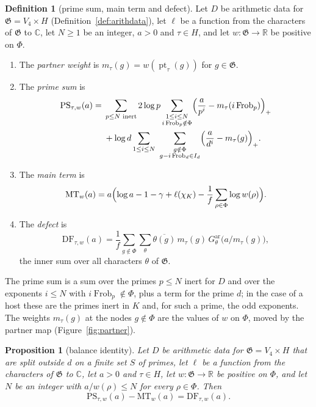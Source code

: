 \documentclass[11pt]{amsbook}
\theoremstyle{plain}
\newtheorem{proposition}[theorem]{Proposition}
\theoremstyle{definition}
\newtheorem{definition}[theorem]{Definition}
\theoremstyle{remark}
\numberwithin{equation}{section}
\numberwithin{figure}{chapter}
\numberwithin{table}{chapter}
\newcommand{\R}{\mathbb{R}}
\renewcommand{\C}{\mathbb{C}}
\newcommand{\Frob}{\operatorname{Frob}}
\newcommand{\GG}{\mathfrak{G}}
\newcommand{\pt}{\operatorname{pt}}
\newcommand{\GPsi}{G^{\mathrm{ar}}}
\newcommand{\PS}{\mathrm{PS}}
\newcommand{\MT}{\mathrm{MT}}
\newcommand{\DF}{\mathrm{DF}}
\begin{document}
\begin{definition}[prime sum, main term and defect]\label{def:ask}
Let $D$ be arithmetic data for $\GG=V_4\times H$
(Definition~\ref{def:arithdata}), let $\ell$ be a function from the
characters of $\GG$ to $\C$, let $N\ge1$ be an integer, $a>0$ and
$\tau\in H$, and let $w\colon\GG\to\R$ be positive on $\Phi$.
\begin{enumerate}[label=(\arabic*)]
\item\label{item:ask-partner}
The \emph{partner weight} is $m_\tau(g)=w(\pt_\tau(g))$ for
$g\in\GG$.
\item The \emph{prime sum} is
\[
\begin{aligned}
\PS_{\tau,w}(a)={}&\sum_{p\le N\text{ inert}}2\log p
\sum_{\substack{1\le i\le N\\ i\Frob_p\notin\Phi}}
\Bigl(\frac{a}{p^i}-m_\tau(i\Frob_p)\Bigr)_+\\
&+\log d\sum_{1\le i\le N}\ \sum_{\substack{g\notin\Phi\\
g-i\Frob_d\in I_d}}\Bigl(\frac{a}{d^i}-m_\tau(g)\Bigr)_+.
\end{aligned}
\]
\item The \emph{main term} is
\[
\MT_w(a)=a\Bigl(\log a-1-\gamma+\ell(\chi_K)-\frac1f
\sum_{\rho\in\Phi}\log w(\rho)\Bigr).
\]
\item The \emph{defect} is
\[
\DF_{\tau,w}(a)=\frac1f\sum_{g\notin\Phi}\sum_\theta
\overline{\theta(g)}\,m_\tau(g)\,\GPsi_\theta\bigl(a/m_\tau(g)\bigr),
\]
the inner sum over all characters $\theta$ of $\GG$.
\end{enumerate}
\end{definition}

\noindent The prime sum is a sum over the primes $p\le N$ inert for
$D$ and over the exponents $i\le N$ with $i\Frob_p\notin\Phi$, plus a
term for the prime $d$; in the case of a host these are the primes
inert in $K$ and, for such a prime, the odd exponents. The weights
$m_\tau(g)$ at the nodes $g\notin\Phi$ are the values of $w$ on $\Phi$,
moved by the partner map (Figure~\ref{fig:partner}).

\begin{proposition}[balance identity]\label{prop:balance}
Let $D$ be arithmetic data for $\GG=V_4\times H$ that are split outside
$d$ on a finite set $S$ of primes, let $\ell$ be a function from the
characters of $\GG$ to $\C$, let $a>0$ and $\tau\in H$, let
$w\colon\GG\to\R$ be positive on $\Phi$, and let $N$ be an integer
with $a/w(\rho)\le N$ for every $\rho\in\Phi$. Then
\[
\PS_{\tau,w}(a)-\MT_w(a)=\DF_{\tau,w}(a).
\]
\end{proposition}
\end{document}
